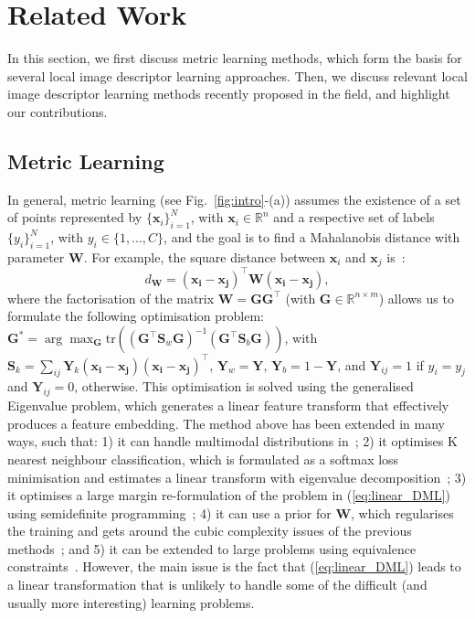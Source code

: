 \documentclass[10pt,twocolumn,letterpaper]{article}
\begin{document}
\section{Related Work}

In this section, we first discuss metric learning methods, which form the basis for several local image descriptor learning approaches.  Then, we discuss relevant local image descriptor learning methods recently proposed in the field, and highlight our contributions.

\subsection{Metric Learning}
\label{sec:metric_learning}

In general, metric learning (see Fig.~\ref{fig:intro}-(a)) assumes the existence of a set of points represented by $\{ \mathbf{x}_i \}_{i=1}^N$, with $\mathbf{x}_i \in \mathbb R^n$ and a respective set of labels $\{ y_i \}_{i=1}^N$, with $y_i \in \{1,...,C\}$, and the goal is to find a Mahalanobis distance with parameter $\mathbf{W}$.  For example, the square distance between $\mathbf{x}_i$ and $\mathbf{x}_j$ is~\cite{jain2012metric,weinberger2005distance}:
\begin{equation}
d_{\mathbf{W}} = (\mathbf{\mathbf{x}_i-\mathbf{x}_j})^\top \mathbf{W} (\mathbf{\mathbf{x}_i-\mathbf{x}_j}),
\label{eq:linear_DML}
\end{equation}
where the factorisation of the matrix $\mathbf{W} = \mathbf{G}\mathbf{G}^\top$ (with $\mathbf{G} \in \mathbb R^{n \times m}$) allows us to formulate the following optimisation problem: $\mathbf{G}^* = \arg \max_{\mathbf{G}} \text{tr} \left  ( (\mathbf{G}^\top \mathbf{S}_w \mathbf{G})^{-1} (\mathbf{G}^\top \mathbf{S}_b \mathbf{G}) \right ) $, with $ \mathbf{S}_k = \sum_{ij} \mathbf{Y}_k (\mathbf{\mathbf{x}_i-\mathbf{x}_j})(\mathbf{\mathbf{x}_i-\mathbf{x}_j})^\top$, 
$\mathbf{Y}_w = \mathbf{Y}$, $\mathbf{Y}_b = 1 - \mathbf{Y}$, and $\mathbf{Y}_{ij}=1$ if $y_i=y_j$ and $\mathbf{Y}_{ij}=0$, otherwise.  This optimisation is solved using the generalised Eigenvalue problem, which generates a linear feature transform that effectively produces a feature embedding.  
The method above has been extended in many ways, such that: 
1) it can handle multimodal distributions in~\cite{sugiyama2007dimensionality};
2) it optimises K nearest neighbour classification, which is formulated as a softmax loss minimisation and estimates a linear transform with eigenvalue decomposition~\cite{goldberger2004neighbourhood};
3) it optimises a large margin re-formulation of the problem in (\ref{eq:linear_DML}) using semidefinite programming~\cite{weinberger2005distance};  
4) it can use a prior for $\mathbf{W}$, which regularises the training and gets around the cubic complexity issues of the previous methods~\cite{davis2007information}; and 5) it can be extended to large problems using equivalence constraints~\cite{koestinger2012large}.
However, the main issue is the fact that (\ref{eq:linear_DML}) leads to a linear transformation that is unlikely to handle some of the difficult (and usually more interesting) learning problems.
\end{document}
